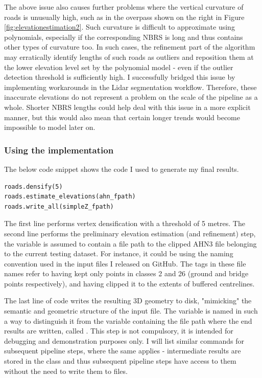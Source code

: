 The above issue also causes further problems where the vertical curvature of roads is unusually high, such as in the overpass shown on the right in Figure \ref{fig:elevationestimation2}. Such curvature is difficult to approximate using polynomials, especially if the corresponding NBRS is long and thus contains other types of curvature too. In such cases, the refinement part of the algorithm may erratically identify lengths of such roads as outliers and reposition them at the lower elevation level set by the polynomial model - even if the outlier detection threshold is sufficiently high. I successfully bridged this issue by implementing workarounds in the Lidar segmentation workflow. Therefore, these inaccurate elevations do not represent a problem on the scale of the pipeline as a whole. Shorter NBRS lengths could help deal with this issue in a more explicit manner, but this would also mean that certain longer trends would become impossible to model later on.

\subsubsection{Using the implementation}

The below code snippet shows the code I used to generate my final results.

\begin{lstlisting}
roads.densify(5)
roads.estimate_elevations(ahn_fpath)
roads.write_all(simpleZ_fpath)
\end{lstlisting}

The first line performs vertex densification with a threshold of 5 metres. The second line performs the preliminary elevation estimation (and refinement) step, the variable  is assumed to contain a file path to the clipped AHN3 file belonging to the current testing dataset. For instance, it could be  using the naming convention used in the input files I released on GitHub. The tags  in these file names refer to having kept only points in classes 2 and 26 (ground and bridge points respectively), and having clipped it to the extents of buffered centrelines.

The last line of code writes the resulting 3D geometry to disk, "mimicking" the semantic and geometric structure of the input file. The variable is named in such a way to distinguish it from the variable containing the file path where the end results are written, called . This step is not compulsory, it is intended for debugging and demonstration purposes only. I will list similar commands for subsequent pipeline steps, where the same applies - intermediate results are stored in the class and thus subsequent pipeline steps have access to them without the need to write them to files.

